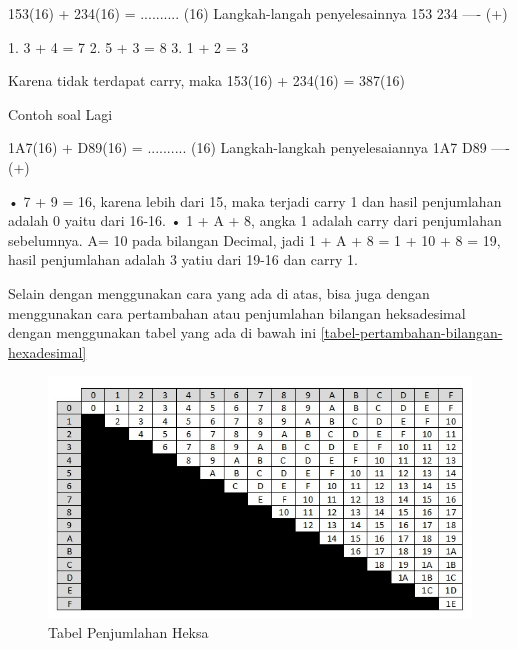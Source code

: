 	153(16) + 234(16) = .......... (16) 
	Langkah-langah penyelesainnya
	153 
	234 
	---- (+)

	1. 3 + 4 = 7
	2. 5 + 3 = 8
	3. 1 + 2 = 3

	Karena tidak terdapat carry, maka 153(16) + 234(16) = 387(16)

	Contoh soal Lagi 

	1A7(16) + D89(16) = .......... (16)
	Langkah-langkah penyelesaiannya
	1A7
	D89
	---- (+)

	•	7 + 9 = 16, karena lebih dari 15, maka terjadi carry 1 dan hasil penjumlahan adalah 0 yaitu dari 16-16.
	•	1 + A + 8, angka 1 adalah carry dari penjumlahan sebelumnya. A= 10 pada bilangan Decimal, jadi 1 + A + 8 = 1 + 10 + 8 = 19, hasil penjumlahan adalah 3 yatiu dari 19-16 dan carry 1.
	
	Selain dengan menggunakan cara yang ada di atas, bisa juga dengan menggunakan cara pertambahan atau penjumlahan bilangan heksadesimal dengan menggunakan tabel yang ada di bawah ini \ref{tabel-pertambahan-bilangan-hexadesimal}
			\begin{figure} [ht]
				\centerline{\includegraphics[width=1\textwidth]{figures/tabel-pertambahan-bilangan-hexadesimal.jpg}}
				\caption{Tabel Penjumlahan Heksa}
				\label{Tabel-Penjumlahan-Heksa}
			\end{figure}

